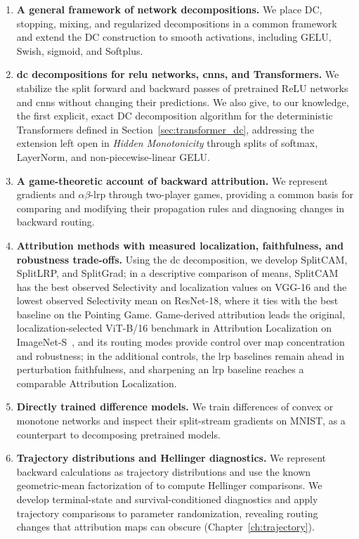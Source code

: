 \begin{enumerate}
    \item \textbf{A general framework of network decompositions.}
    We place DC, stopping, mixing, and regularized decompositions in a common framework and extend the DC construction to smooth activations, including GELU, Swish, sigmoid, and Softplus.

    \item \textbf{\acs{dc} decompositions for \acs{relu} networks, \acsp{cnn}, and Transformers.}
    We stabilize the split forward and backward passes of pretrained ReLU networks and \acfp{cnn} without changing their predictions. We also give, to our knowledge, the first explicit, exact DC decomposition algorithm for the deterministic Transformers defined in Section~\ref{sec:transformer_dc}, addressing the extension left open in \emph{Hidden Monotonicity} through splits of softmax, LayerNorm, and non-piecewise-linear GELU.

    \item \textbf{A game-theoretic account of backward attribution.}
    We represent gradients and $\alpha\beta$-\ac{lrp} through two-player games, providing a common basis for comparing and modifying their propagation rules and diagnosing changes in backward routing.

    \item \textbf{Attribution methods with measured localization, faithfulness, and robustness trade-offs.}
    Using the \acs{dc} decomposition, we develop SplitCAM, SplitLRP, and SplitGrad; in a descriptive comparison of means, SplitCAM has the best observed Selectivity and localization values on VGG-16 and the lowest observed Selectivity mean on ResNet-18, where it ties with the best baseline on the Pointing Game. Game-derived attribution leads the original, localization-selected ViT-B/16 benchmark in Attribution Localization on ImageNet-S~\parencite{gao2022luss}, and its routing modes provide control over map concentration and robustness; in the additional controls, the \ac{lrp} baselines remain ahead in perturbation faithfulness, and sharpening an \ac{lrp} baseline reaches a comparable Attribution Localization.

    \item \textbf{Directly trained difference models.}
    We train differences of convex or monotone networks and inspect their split-stream gradients on MNIST, as a counterpart to decomposing pretrained models.

    \item \textbf{Trajectory distributions and Hellinger diagnostics.}
    We represent backward calculations as trajectory distributions and use the known geometric-mean factorization of \textcite{Kazakos1978} to compute Hellinger comparisons. We develop terminal-state and survival-conditioned diagnostics and apply trajectory comparisons to parameter randomization, revealing routing changes that attribution maps can obscure (Chapter~\ref{ch:trajectory}).
\end{enumerate}

